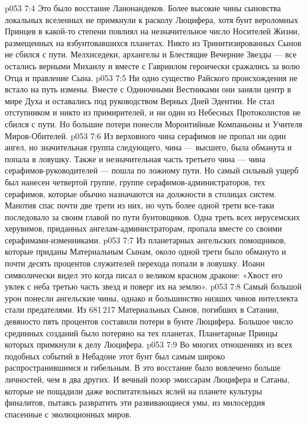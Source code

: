 \vs p053 7:4 Это было восстание Ланонандеков. Более высокие чины сыновства локальных вселенных не примкнули к расколу Люцифера, хотя бунт вероломных Принцев в какой\hyp{}то степени повлиял на незначительное число Носителей Жизни, размещенных на взбунтовавшихся планетах. Никто из Тринитизированных Сынов не сбился с пути. Мелхиседеки, архангелы и Блестящие Вечерние Звезды --- все остались верными Михаилу и вместе с Гавриилом героически сражались за волю Отца и правление Сына.
\vs p053 7:5 Ни одно существо Райского происхождения не встало на путь измены. Вместе с Одиночными Вестниками они заняли центр в мире Духа и оставались под руководством Верных Дней Эдентии. Не стал отступником и никто из примирителей, и ни один из Небесных Протоколистов не сбился с пути. Но большие потери понесли Моронтийные Компаньоны и Учителя Миров\hyp{}Обителей.
\vs p053 7:6 Из верховного чина серафимов не пропал ни один ангел, но значительная группа следующего, чина --- высшего, была обманута и попала в ловушку. Также и незначительная часть третьего чина --- чина серафимов\hyp{}руководителей --- пошла по ложному пути. Но самый сильный ущерб был нанесен четвертой группе, группе серафимов\hyp{}администраторов, тех серафимов, которые обычно назначаются на должности в столицах систем. Манотия спас почти две трети из них, но чуть более одной трети все\hyp{}таки последовало за своим главой по пути бунтовщиков. Одна треть всех иерусемских херувимов, приданных ангелам\hyp{}администраторам, пропала вместе со своими серафимами\hyp{}изменниками.
\vs p053 7:7 Из планетарных ангельских помощников, которые приданы Материальным Сынам, около одной трети было обмануто и почти десять процентов служителей перехода попали в ловушку. Иоанн символически видел это когда писал о великом красном драконе: «Хвост его увлек с неба третью часть звезд и поверг их на землю».
\vs p053 7:8 Самый большой урон понесли ангельские чины, однако и большинство низших чинов интеллекта стали предателями. Из 681\,217 Материальных Сынов, погибших в Сатании, девяносто пять процентов составили потери в бунте Люцифера. Большое число срединных созданий было потеряно на тех планетах, Планетарные Принцы которых примкнули к делу Люцифера.
\vs p053 7:9 \pc Во многих отношениях из всех подобных событий в Небадоне этот бунт был самым широко распространившимся и гибельным. В это восстание было вовлечено больше личностей, чем в два других. И вечный позор эмиссарам Люцифера и Сатаны, которые не пощадили даже воспитательных яслей на планете культуры финалитов, пытаясь развратить эти развивающиеся умы, из милосердия спасенные с эволюционных миров.
